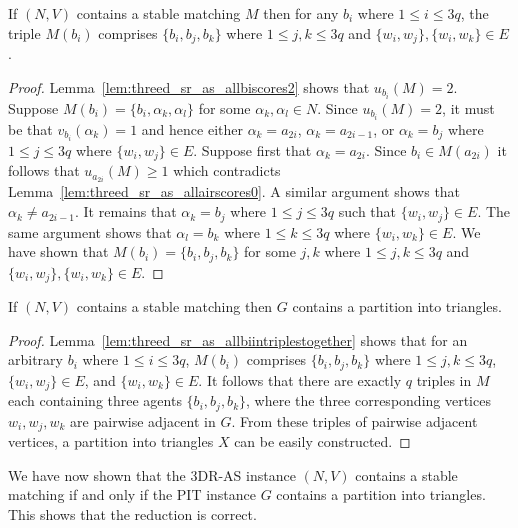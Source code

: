 \begin{lem}
\label{lem:threed_sr_as_allbiintriplestogether}
If $(N, V)$ contains a stable matching $M$ then for any $b_i$ where $1 \leq i \leq 3q$, the triple $M(b_i)$ comprises $\{b_i, b_j, b_k\}$ where $1 \leq j,k \leq 3q$ and $\{w_i, w_j\}, \{w_i, w_k\} \in E$.
\end{lem}
\begin{proof}
Lemma~\ref{lem:threed_sr_as_allbiscores2} shows that $u_{b_i}(M)=2$. Suppose $M(b_i)=\{ b_i, \alpha_k, \alpha_l \}$ for some $\alpha_k, \alpha_l\in N$. Since $u_{b_i}(M)=2$, it must be that $v_{b_i}(\alpha_k)=1$ and hence either $\alpha_k = a_{2i}$, $\alpha_k = a_{2i-1}$, or $\alpha_k = b_j$ where $1\leq j \leq 3q$ where $\{w_i, w_j\}\in E$. Suppose first that $\alpha_k = a_{2i}$. Since $b_i \in M(a_{2i})$ it follows that $u_{a_{2i}}(M) \geq 1$ which contradicts Lemma~\ref{lem:threed_sr_as_allairscores0}.  A similar argument shows that $\alpha_k \neq a_{2i-1}$. It remains that $\alpha_k = b_j$ where $1\leq j \leq 3q$ such that $\{ w_i, w_j \} \in E$. The same argument shows that $\alpha_l = b_k$ where $1\leq k \leq 3q$ where $\{ w_i, w_k \} \in E$. We have shown that $M(b_i) = \{ b_i, b_j, b_k \}$ for some $j, k$ where $1 \leq j,k \leq 3q$ and $\{ w_i, w_j \}, \{ w_i, w_k \} \in E$.
\end{proof}

\begin{lem}
\label{lem:threed_sr_as_binary_reduction_second_direction_conclusion}
If $(N, V)$ contains a stable matching then $G$ contains a partition into triangles.
\end{lem}
\begin{proof}
Lemma~\ref{lem:threed_sr_as_allbiintriplestogether} shows that for an arbitrary $b_i$ where $1 \leq i \leq 3q$, $M(b_i)$ comprises $\{b_i, b_j, b_k\}$ where $1 \leq j,k \leq 3q$, $\{w_i, w_j\}\in E$, and $\{w_i, w_k\}\in E$. It follows that there are exactly $q$ triples in $M$ each containing three agents $\{b_i, b_j, b_k\}$, where the three corresponding vertices $w_i, w_j, w_k$ are pairwise adjacent in $G$. From these triples of pairwise adjacent vertices, a partition into triangles $X$ can be easily constructed.
\end{proof}


We have now shown that the 3DR-AS instance $(N, V)$ contains a stable matching if and only if the PIT instance $G$ contains a partition into triangles. This shows that the reduction is correct.

